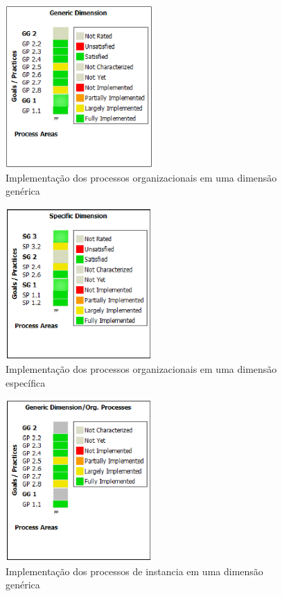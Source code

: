\documentclass[a4paper, 11pt]{article}
\begin{document}
\begin{figure}[h]
  \centering
  \includegraphics[width=0.5\textwidth]{figuras/organization_generic.eps}
  \caption{Implementação dos processos organizacionais em uma dimensão
  genérica}
  \label{fig:organization_generic}
\end{figure}

\begin{figure}[h]
  \centering
  \includegraphics[width=0.5\textwidth]{figuras/organization_specific.eps}
  \caption{Implementação dos processos organizacionais em uma dimensão
  específica}
  \label{fig:organization_specific}
\end{figure}

\begin{figure}[h]
  \centering
  \includegraphics[width=0.5\textwidth]{figuras/instantiation_generic.eps}
  \caption{Implementação dos processos de instancia em uma dimensão genérica}
  \label{fig:instantiation_generic}
\end{figure}
\end{document}
